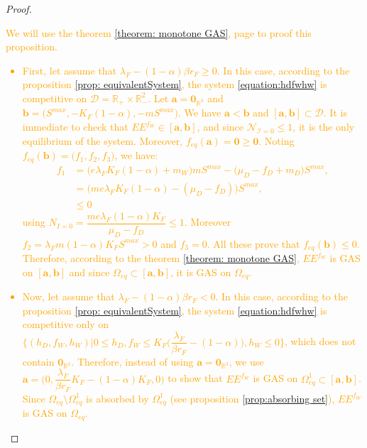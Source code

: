 \documentclass{article}
\newcommand{\lfw}{\lambda_{F}}
\newcommand{\lfw}{\lambda_{F}}
\newcommand{\cI}{\mathcal{I}}
\newcommand{\R}{\mathbb{R}}
\newcommand{\N}{\mathcal{N}}
\newcommand{\vdeux}[1]{\textcolor{orange}{#1}}
\theoremstyle{definition}
\theoremstyle{remark}
\begin{document}
\begin{proof}
\vdeux{
We will use the theorem \ref{theorem: monotone GAS}, page \pageref{theorem: monotone GAS} to proof this proposition.
\begin{itemize}
\item First, let assume that $\lfw -(1-\alpha) \beta r_F \geq 0$. In this case, according to the proposition \ref{prop: equivalentSystem}, the system \eqref{equation:hdfwhw} is competitive on $\mathcal{D} = \R_+\times \R_-^2$. Let $\mathbf{a} = \mathbf{0}_{\R^3}$ and $\mathbf{b} = \Big(S^{max}, -K_F(1-\alpha), -mS^{max}\Big)$. We have $\mathbf{a} < \mathbf{b}$ and $[\mathbf{a}, \mathbf{b}] \subset \mathcal{D}$. 
It is immediate to check that $EE^{f_W} \in [\mathbf{a}, \mathbf{b}]$, and since $\N_{\cI = 0} \leq 1$, it is the only equilibrium of the system. Moreover, $f_{eq}(\mathbf{a}) = \mathbf{0} \geq \mathbf{0}$. Noting $f_{eq}(\mathbf{b}) = \Big(f_1, f_2, f_3\Big)$, we have:
\begin{align*}
f_1 &= \Big(e\lfw K_F(1-\alpha) + m_W\Big)mS^{max} - \Big(\mu_D - f_D + m_D\Big) S^{max}, \\
&= \Big(m e\lfw K_F(1-\alpha) - (\mu_D - f_D) \Big)S^{max}, \\
& \leq 0
\end{align*}
using $N_{I= 0} = \dfrac{m e \lfw (1-\alpha)K_F}{\mu_D - f_D} \leq 1$. 
Moreover $f_2 = \lfw m (1-\alpha) K_F S^{max} > 0$ and $f_3 = 0$. All these prove that $f_{eq}(\mathbf{b}) \leq 0$. Therefore, according to the theorem \ref{theorem: monotone GAS}, $EE^{f_W}$ is GAS on $[\mathbf{a}, \mathbf{b}]$ and since $\Omega_{eq} \subset [\mathbf{a}, \mathbf{b}]$, it is GAS on $\Omega_{eq}$.
\item Now, let assume that $\lfw -(1-\alpha) \beta r_F < 0$. In this case, according to the proposition \ref{prop: equivalentSystem}, the system \eqref{equation:hdfwhw} is competitive only on $\Big\{(h_D, f_W, h_W) | 0 \leq h_D, f_W \leq K_F\big(\dfrac{\lfw}{\beta r_F}-(1-\alpha)\big), h_W \leq 0 \Big\}$, which does not contain $\mathbf{0}_{\R^3}$. Therefore, instead of using $\mathbf{a}= \mathbf{0}_{\R^3}$, we use $\mathbf{a} = \Big(0, \dfrac{\lfw}{\beta r_F}K_F -	(1-\alpha)K_F, 0 \Big)$  to show that $EE^{f_W}$ is GAS on $\Omega_{eq}^1 \subset[\mathbf{a}, \mathbf{b}]$. Since $\Omega_{eq}\setminus\Omega_{eq}^1$ is absorbed by $\Omega_{eq}^1$ (see proposition \ref{prop:absorbing set}), $EE^{f_W}$ is GAS on $\Omega_{eq}$.
\end{itemize}}
\end{proof}
\end{document}
